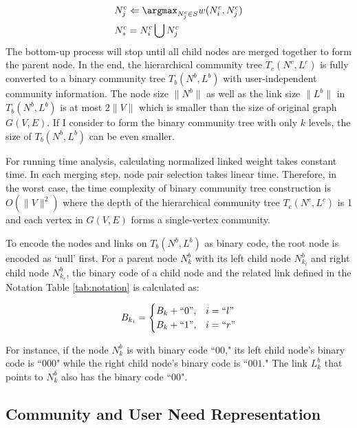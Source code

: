 \begin{equation}  
\begin{aligned} 
& N_{j}^{c} \Leftarrow \argmax_{N_{j}^{c} \in S}w(N_{i}^{c},N_{j}^{c})\\
& N_{*}^{c} = N_{i}^{c}\bigcup N_{j}^{c}
\end{aligned}
\end{equation}
The bottom-up process will stop until all child nodes are merged together to form the parent node. In the end, the hierarchical community tree \textit{$T_{c}(N^{c},L^{c})$} is fully converted to a binary community tree \textit{$T_{b}(N^{b},L^{b})$} with user-independent community information.  The node size $\lVert  N^{b}\rVert$ as well as the link size $\lVert  L^{b}\rVert$  in \textit{$T_{b}(N^{b},L^{b})$} is at most $2\lVert V \rVert$ which is smaller than the size of original graph $G(V,E)$. If I consider to form the binary community tree with only $k$ levels, the size of \textit{$T_{b}(N^{b},L^{b})$} can be even smaller. 

For running time analysis, calculating normalized linked weight takes constant time. In each merging step, node pair selection takes linear time. Therefore, in the worst case, the time complexity of binary community tree construction is $O(\rVert V\lVert^2)$ where the depth of the hierarchical community tree $T_{c}(N^{c},L^{c})$ is 1 and each vertex in $G(V,E)$ forms a single-vertex community.

To encode the nodes and links on $T_{b}(N^{b},L^{b})$ as binary code, the root node is encoded as `null' first. For a parent node \textit{$N_{k}^{b}$} with its left child node \textit{$N^{b}_{k_{l}}$} and right child node \textit{$N^{b}_{k_{r}}$}, the binary code of a child node and the related link defined in the Notation Table \ref{tab:notation} is calculated as: 

\begin{eqnarray}\text{$B_{k_{i}}$}=
\begin{cases}
\text{$B_{k}$}+``0", & i = ``l"\cr 
\text{$B_{k}$}+``1", & i = ``r"
\end{cases}
\end{eqnarray} 

For instance, if the node \textit{$N_{k}^{b}$} is with binary code ``$00$," its left child node's binary code is ``$000$" while the right child node's binary code is ``$001$." The link \textit{$L_{k}^{b}$} that points to \textit{$N_{k}^{b}$} also has the binary code ``$00$". 

\subsection{Community and User Need Representation}

